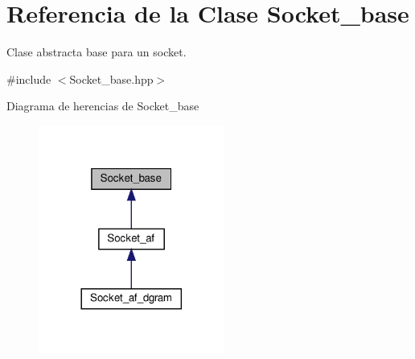 \hypertarget{classSocket__base}{}\section{Referencia de la Clase Socket\+\_\+base}
\label{classSocket__base}


Clase abstracta base para un socket.  




{\ttfamily \#include $<$Socket\+\_\+base.\+hpp$>$}



Diagrama de herencias de Socket\+\_\+base
\nopagebreak
\begin{figure}[H]
\begin{center}
\leavevmode
\includegraphics[width=173pt]{classSocket__base__inherit__graph}
\end{center}
\end{figure}

